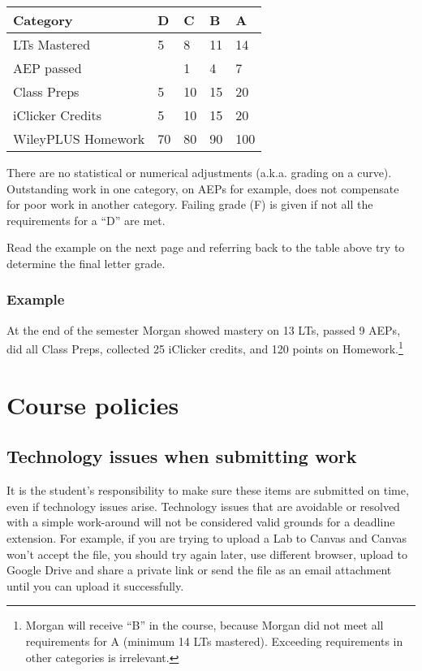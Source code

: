 \begin{longtable}[]{@{}lllll@{}}
\toprule
Category & D & C & B & A \\
\midrule
\endhead
LTs Mastered & 5 & 8 & 11 & 14 \\
AEP passed & & 1 & 4 & 7 \\
Class Preps & 5 & 10 & 15 & 20 \\
iClicker Credits & 5 & 10 & 15 & 20 \\
WileyPLUS Homework & 70 & 80 & 90 & 100 \\
\bottomrule
\end{longtable}

There are no statistical or numerical adjustments (a.k.a. grading on a
curve). Outstanding work in one category, on AEPs for example, does not
compensate for poor work in another category. Failing grade (F) is given
if not all the requirements for a ``D'' are met.

Read the example on the next page and referring back to the table above
try to determine the final letter grade.

\hypertarget{example}{%
\subsubsection{Example}\label{example}}

At the end of the semester Morgan showed mastery on 13 LTs, passed 9
AEPs, did all Class Preps, collected 25 iClicker credits, and 120 points
on Homework.\footnote{Morgan will receive ``B'' in the course, because
  Morgan did not meet all requirements for A (minimum 14 LTs mastered).
  Exceeding requirements in other categories is irrelevant.}

\hypertarget{course-policies}{%
\section{Course policies}\label{course-policies}}

\hypertarget{technology-issues-when-submitting-work}{%
\subsection{Technology issues when submitting
work}\label{technology-issues-when-submitting-work}}

It is the student's responsibility to make sure these items are
submitted on time, even if technology issues arise. Technology issues
that are avoidable or resolved with a simple work-around will not be
considered valid grounds for a deadline extension. For example, if you
are trying to upload a Lab to Canvas and Canvas won't accept the file,
you should try again later, use different browser, upload to Google
Drive and share a private link or send the file as an email attachment
until you can upload it successfully.

